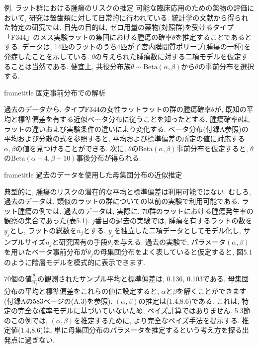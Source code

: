 \documentclass[10pt,dvipdfmx,a4]{beamer}
\newcommand{\dbox}[1]{\begin{beamercolorbox}[wd=122mm, sep=0pt, shadow=false, rounded=false]{frametitle} { #1}\end{beamercolorbox}}
\begin{document}

\begin{frame}{例. ラット群における腫瘍のリスクの推定}
可能な臨床応用のための薬物の評価において, 研究は齧歯類に対して日常的に行われている.
統計学の文献から得られた特定の研究では, 目先の目的は, ゼロ用量の薬物(対照群)を受けるタイプ「F344」のメス実験ラットの集団における腫瘍の確率$\theta$を推定することであるとする.
データは, 14匹のラットのうち4匹が子宮内膜間質ポリープ(腫瘍の一種)を発症したことを示している.
$\theta$の与えられた腫瘍数に対する二項モデルを仮定することは当然である.
便宜上, 共役分布族$\theta\sim\text{Beta}(\alpha,\beta)$から$\theta$の事前分布を選択する.

\dbox{固定事前分布での解析}
過去のデータから, タイプF344の女性ラットラットの群の腫瘍確率$\theta$が, 既知の平均と標準偏差を有する近似ベータ分布に従うことを知ったとする.
腫瘍確率$\theta$は, ラットの違いおよび実験条件の違いにより変化する.
ベータ分布(付録A参照)の平均および分散の式を参照すると, 平均および標準偏差の所定の値に対応する$\alpha, \beta$の値を見つけることができる.
次に, $\theta$の$\text{Beta}(\alpha,\beta)$事前分布を仮定すると, $\theta$の$\text{Beta}(\alpha+4,\beta+10)$事後分布が得られる.
\end{frame}


\begin{frame}
\dbox{過去のデータを使用した母集団分布の近似推定}
典型的に, 腫瘍のリスクの潜在的な平均と標準偏差は利用可能ではない.
むしろ, 過去のデータは, 類似のラットの群についての以前の実験で利用可能である.
ラット腫瘍の例では, 過去のデータは, 実際に, 70群のラットにおける腫瘍発生率の観察の集合であった(表5.1).
$j$番目の過去の実験では, 腫瘍を有するラットの数を$y_j$とし, ラットの総数を$n_j$とする.
$y_j$を独立した二項データとしてモデル化し, サンプルサイズ$n_j$と研究固有の手段$\theta_j$を与える.
過去の実験で, パラメータ$(\alpha,\beta)$を用いたベータ事前分布が$\theta_j$の母集団分布をよく表していると仮定すると, 図5.1のように階層モデルを模式的に表示できます.

70個の値$\tfrac{y_j}{n_j}$の観測されたサンプル平均と標準偏差は, 0.136, 0.103である.
母集団分布の平均と標準偏差をこれらの値に設定すると, $\alpha$と$\beta$を解くことができます(付録Aの583ページの(A.3)を参照).
$(\alpha, \beta)$の推定は(1.4,8.6)である.
これは, 特定の完全な確率モデルに基づいていないため, ベイズ計算ではありません.
5.3節のこの例では, $(\alpha,\beta)$を推定するために, より完全なベイズ手法を提示する.
推定値(1.4,8.6)は, 単に母集団分布のパラメータを推定するという考え方を探る出発点に過ぎない.
\end{frame}
\end{document}
